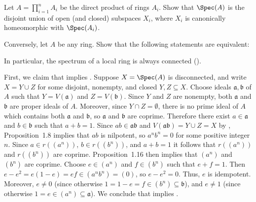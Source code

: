 \begin{exercise}
Let \(A = \prod_{i=1}^n A_i\) be the direct product of rings \(A_i\).
Show that \(\Spec(A)\) is the disjoint union of open (and closed) subspaces \(X_i\), where \(X_i\) is canonically homeomorphic with \(\Spec(A_i)\).

Conversely, let \(A\) be any ring.
Show that the following statements are equivalent:

In particular, the spectrum of a local ring is always connected ().
\end{exercise}

\begin{solution}
First, we claim that  implies .
Suppose \(X = \Spec(A)\) is disconnected, and write \(X = Y \cup Z\) for some disjoint, nonempty, and closed \(Y, Z \subseteq X\).
Choose ideals \(\mathfrak{a}, \mathfrak{b}\) of \(A\) such that \(Y = V(\mathfrak{a})\) and \(Z = V(\mathfrak{b})\).
Since \(Y\) and \(Z\) are nonempty, both \(\mathfrak{a}\) and \(\mathfrak{b}\) are proper ideals of \(A\).
Moreover, since \(Y \cap Z = \emptyset\), there is no prime ideal of \(A\) which contains both \(\mathfrak{a}\) and \(\mathfrak{b}\), so \(\mathfrak{a}\) and \(\mathfrak{b}\) are coprime.
Therefore there exist \(a \in \mathfrak{a}\) and \(b \in \mathfrak{b}\) such that \(a + b = 1\).
Since \(a b \in \mathfrak{a} \mathfrak{b}\) and \(V(\mathfrak{a} \mathfrak{b}) = Y \cup Z = X\) by , Proposition~1.8 implies that \(a b\) is nilpotent, so \(a^n b^n = 0\) for some positive integer \(n\).
Since \(a \in r((a^n))\), \(b \in r((b^n))\), and \(a + b = 1\) it follows that \(r((a^n))\) and \(r((b^n))\) are coprime.
Proposition~1.16 then implies that \((a^n)\) and \((b^n)\) are coprime.
Choose \(e \in (a^n)\) and \(f \in (b^n)\) such that \(e + f = 1\).
Then \(e - e^2 = e (1 - e) = e f \in (a^n b^n) = (0)\), so \(e - e^2 = 0\).
Thus, \(e\) is idempotent.
Moreover, \(e \neq 0\) (since otherwise \(1 = 1 - e = f \in (b^n) \subseteq \mathfrak{b}\)), and \(e \neq 1\) (since otherwise \(1 = e \in (a^n) \subseteq \mathfrak{a}\)).
We conclude that  implies .

\end{solution}